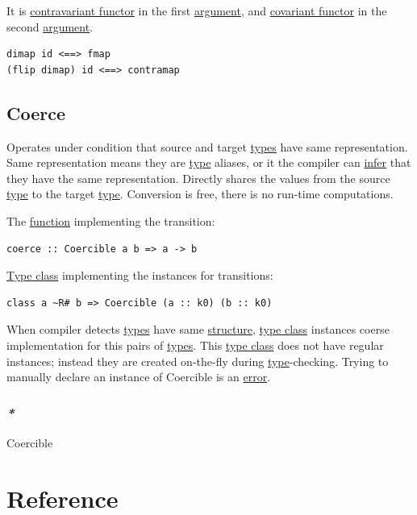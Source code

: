 \documentclass[a4paper,14pt,oneside]{book}
\begin{document}
It is \hyperref[org0d39131]{contravariant functor} in the first \hyperref[orgaffac3e]{argument}, and \hyperref[org9d99b55]{covariant functor} in the second \hyperref[orgaffac3e]{argument}.

\begin{verbatim}
dimap id <==> fmap
(flip dimap) id <==> contramap
\end{verbatim}

\chapter{Coerce}
\label{sec:orgc2f22c5}

Operates under condition that source and target \hyperref[org06447a0]{types} have same representation.
Same representation means they are \hyperref[orgcb0bd28]{type} aliases, or it the compiler can \hyperref[orgd46250a]{infer} that they have the same representation. 
Directly shares the values from the source \hyperref[orgcb0bd28]{type} to the target \hyperref[orgcb0bd28]{type}.
Conversion is free, there is no run-time computations.

The \hyperref[org05caf05]{function} implementing the transition:
\begin{verbatim}
coerce :: Coercible a b => a -> b
\end{verbatim}

\hyperref[orgb593622]{Type class} implementing the instances for transitions:
\begin{verbatim}
class a ~R# b => Coercible (a :: k0) (b :: k0)
\end{verbatim}
When compiler detects \hyperref[org06447a0]{types} have same \hyperref[orga1adad1]{structure}, \hyperref[orgb593622]{type class} instances coerse implementation for this pairs of \hyperref[org06447a0]{types}. This \hyperref[orgb593622]{type class} does not have regular instances; instead they are created on-the-fly during \hyperref[orgcb0bd28]{type}-checking. Trying to manually declare an instance of Coercible is an \hyperref[orgc9a399b]{error}.

\section{\emph{*}}
\label{sec:orga078d77}

Coercible

\part{Reference}
\label{sec:org72f08f3}
\end{document}
